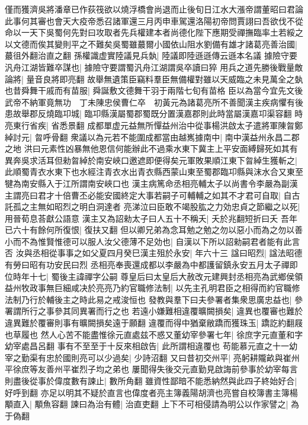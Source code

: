僅而獲濟吳將潘章已作荻筏欲以燒浮橋會尚退而止後旬日江水大漲帝謂董昭曰君論此事何其審也會天大疫帝悉召諸軍還三月丙申車駕還洛陽初帝問賈詡曰吾欲伐不從命以一天下吳蜀何先對曰攻取者先兵權建本者尚德化陛下應期受禪撫臨率土若綏之以文德而俟其變則平之不難矣吳蜀雖蕞爾小國依山阻水劉備有雄才諸葛亮善治國|{
	蕞徂外翻治直之翻}
孫權識虚實陸議見兵埶|{
	陸議即陸遜遜傳云遜本名議}
據險守要汎舟江湖皆難卒謀也|{
	據險守要謂蜀汎舟江湖謂吳卒讀曰猝}
用兵之道先勝後戰量敵論將|{
	量音良將即亮翻}
故舉無遺策臣竊料羣臣無備權對雖以天威臨之未見萬全之埶也昔舜舞干戚而有苗服|{
	舜誕敷文德舞干羽于兩階七旬有苗格}
臣以為當今宜先文後武帝不納軍竟無功　丁未陳忠侯曹仁卒　初黃元為諸葛亮所不善聞漢主疾病懼有後患故舉郡反燒臨卭城|{
	臨卭縣漢屬蜀郡蜀既分置漢嘉郡則此時當屬漢嘉卭渠容翻}
時亮東行省疾|{
	省悉景翻}
成都單虚元益無所憚益州治中從事楊洪啟太子遣將軍陳曶鄭綽討元|{
	曶呼骨翻}
衆議以為元若不能圍成都當由越嶲據南中|{
	南中漢益州永昌二郡之地}
洪曰元素性凶暴無他恩信何能辦此不過乘水東下冀主上平安面縛歸死如其有異奔吳求活耳但勑曶綽於南安峽口邀遮即便得矣元軍敗果順江東下曶綽生獲斬之|{
	此順蜀青衣水東下也水經注青衣水出青衣縣西蒙山東至蜀郡臨卭縣與沫水合又東至犍為南安縣入于江所謂南安峽口也}
漢主病篤命丞相亮輔太子以尚書令李嚴為副漢主謂亮曰君才十倍曹丕必能安國終定大事若嗣子可輔輔之如其不才君可自取|{
	自古託孤之主無如昭烈之明白洞達者}
亮涕泣曰臣敢不竭股肱之力効忠貞之節繼之以死|{
	用晉荀息荅獻公語意}
漢主又為詔勑太子曰人五十不稱夭|{
	夭於兆翻短折曰夭}
吾年已六十有餘何所復恨|{
	復扶又翻}
但以卿兄弟為念耳勉之勉之勿以惡小而為之勿以善小而不為惟賢惟德可以服人汝父德薄不足効也|{
	自漢以下所以詔勑嗣君者能有此言否}
汝與丞相從事事之如父夏四月癸巳漢主殂於永安|{
	年六十三}
諡曰昭烈|{
	諡法昭德有勞曰昭有功安民曰烈}
丞相亮奉喪還成都以李嚴為中都護留鎮永安五月太子禪即位時年十七|{
	蜀後主諱禪字公嗣}
尊皇后曰太皇后大赦改元建興封丞相亮為武鄉侯領益州牧政事無巨細咸决於亮亮乃約官職修法制|{
	以先主孔明君臣之相得而約官職修法制乃行於輔後主之時此易之戒浚恒也}
發教與羣下曰夫參署者集衆思廣忠益也|{
	參署謂所行之事參其同異署而行之也}
若遠小嫌難相違覆曠闕損矣|{
	違異也覆審也難於違異難於覆審則事有曠闕損矣遠于願翻}
違覆而得中猶棄敝蹻而獲珠玉|{
	蹻訖約翻屐也草履也}
然人心苦不能盡惟徐元直處兹不惑又董幼宰參署七年|{
	徐庶字元直董和字幼宰處昌呂翻}
事有不至至于十反來相啟告|{
	此所謂相違覆也}
苟能慕元直之十一幼宰之勤渠有忠於國則亮可以少過矣|{
	少詩沼翻}
又曰昔初交州平|{
	亮躬耕隴畝與崔州平徐庶等友善州平崔烈子均之弟也}
屢聞得失後交元直勤見啟誨前參事於幼宰每言則盡後從事於偉度數有諫止|{
	數所角翻}
雖資性鄙暗不能悉納然與此四子終始好合|{
	好呼到翻}
亦足以明其不疑於直言也偉度者亮主簿義陽胡濟也亮嘗自校簿書主簿楊顒直入|{
	顒魚容翻}
諫曰為治有體|{
	治直吏翻}
上下不可相侵請為明公以作家譬之|{
	為于偽翻}
